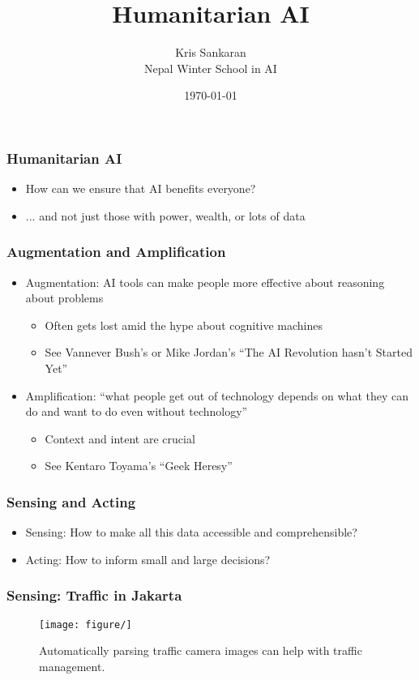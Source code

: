 \documentclass[10pt,mathserif]{beamer}
\title{\large \bfseries Humanitarian AI}
\author{Kris Sankaran\\[3ex] Nepal Winter School in AI}
\date{\today}
\begin{document}
\maketitle

\begin{frame}
  \frametitle{Humanitarian AI}
  \begin{itemize}
  \item How can we ensure that AI benefits everyone?
  \item ... and not just those with power, wealth, or lots of data
  \end{itemize}
\end{frame}

\begin{frame}
  \frametitle{Augmentation and Amplification}
  \begin{itemize}
  \item Augmentation: AI tools can make people more effective about reasoning
    about problems
    \begin{itemize}
    \item Often gets lost amid the hype about cognitive machines
    \item See Vannever Bush's or Mike Jordan's ``The AI Revolution hasn't Started Yet''
    \end{itemize}
  \item Amplification: ``what people get out of technology depends on what they
    can do and want to do even without technology''
    \begin{itemize}
    \item Context and intent are crucial
    \item See Kentaro Toyama's ``Geek Heresy''
    \end{itemize}
  \end{itemize}
\end{frame}

\begin{frame}
  \frametitle{Sensing and Acting}
  \begin{itemize}
  \item Sensing: How to make all this data accessible and comprehensible?
  \item Acting: How to inform small and large decisions?
  \end{itemize}
\end{frame}

\begin{frame}
  \frametitle{Sensing: Traffic in Jakarta}
  \begin{figure}[ht]
    \centering
    \texttt{[image: figure/]}
    \caption{Automatically parsing traffic camera images can help with traffic
      management. \label{fig:label} }
  \end{figure}
\end{frame}
\end{document}
